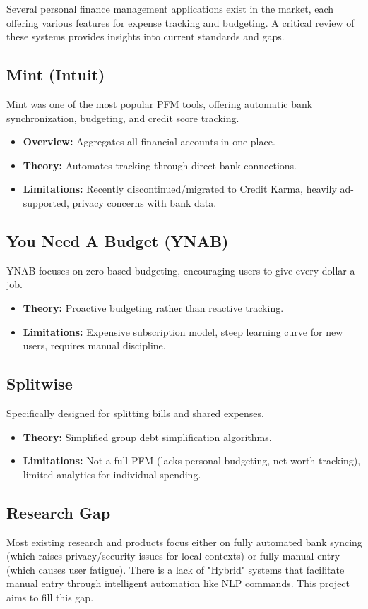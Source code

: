 Several personal finance management applications exist in the market, each offering various features for expense tracking and budgeting. A critical review of these systems provides insights into current standards and gaps.

\subsection{Mint (Intuit)}
Mint was one of the most popular PFM tools, offering automatic bank synchronization, budgeting, and credit score tracking.
\begin{itemize}
    \item \textbf{Overview:} Aggregates all financial accounts in one place.
    \item \textbf{Theory:} Automates tracking through direct bank connections.
    \item \textbf{Limitations:} Recently discontinued/migrated to Credit Karma, heavily ad-supported, privacy concerns with bank data.
\end{itemize}

\subsection{You Need A Budget (YNAB)}
YNAB focuses on zero-based budgeting, encouraging users to give every dollar a job.
\begin{itemize}
    \item \textbf{Theory:} Proactive budgeting rather than reactive tracking.
    \item \textbf{Limitations:} Expensive subscription model, steep learning curve for new users, requires manual discipline.
\end{itemize}

\subsection{Splitwise}
Specifically designed for splitting bills and shared expenses.
\begin{itemize}
    \item \textbf{Theory:} Simplified group debt simplification algorithms.
    \item \textbf{Limitations:} Not a full PFM (lacks personal budgeting, net worth tracking), limited analytics for individual spending.
\end{itemize}

\subsection{Research Gap}
Most existing research and products focus either on fully automated bank syncing (which raises privacy/security issues for local contexts) or fully manual entry (which causes user fatigue). There is a lack of "Hybrid" systems that facilitate manual entry through intelligent automation like NLP commands. This project aims to fill this gap.
